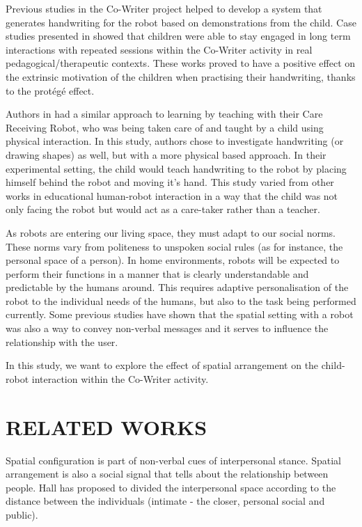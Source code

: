 \documentclass[letterpaper, 10 pt, conference]{ieeeconf}  %
\begin{document}
Previous studies in the Co-Writer project helped to develop a system that generates handwriting for the robot based on demonstrations from the child\cite{hood2015when}.
Case studies presented in \cite{jacq2016building} showed that children were able to stay engaged in long term interactions with repeated sessions within the Co-Writer activity in real pedagogical/therapeutic contexts.
These works proved to have a positive effect on the extrinsic motivation of the children when practising their handwriting, thanks to the protégé effect.

Authors in \cite{Matsuzoe2012} had a similar approach to learning by teaching with their Care Receiving Robot, who was being taken care of and taught by a child using physical interaction. 
In this study, authors chose to investigate handwriting (or drawing shapes) as well, but with a more physical based approach.
In their experimental setting, the child would teach handwriting to the robot by placing himself behind the robot and moving it's hand.
This study varied from other works in educational human-robot interaction in a way that the child was not only facing the robot but would act as a care-taker rather than a teacher.

As robots are entering our living space, they must adapt to our social norms.
These norms vary from politeness to unspoken social rules (as for instance, the personal space of a person).
In home environments, robots will be expected to perform their functions in a manner that is clearly understandable and predictable by the humans around.
This requires adaptive personalisation of the robot to the individual needs of the humans, but also to the task being performed currently.
Some previous studies have shown that the spatial setting with a robot was also a way to convey non-verbal messages and it serves to influence the relationship with the user\cite{Takayama2009,kristoffersson2013measuring}. 

In this study, we want to explore the effect of spatial arrangement on the child-robot interaction within the Co-Writer activity.

\section{RELATED WORKS}
Spatial configuration is part of non-verbal cues of interpersonal stance.
Spatial arrangement is also a social signal that tells about the relationship between people.
Hall \cite{hall} has proposed to divided the interpersonal space according to the distance between the individuals (intimate - the closer, personal social and public).
\end{document}
